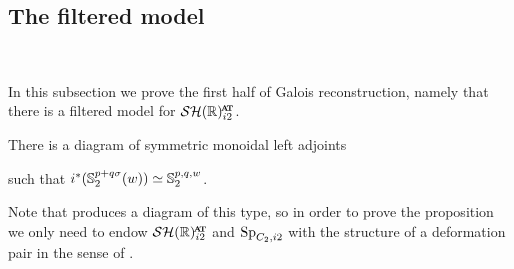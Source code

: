 


\subsection{The filtered model}\

In this subsection we prove the first half of Galois reconstruction,
namely that there is a filtered model for $\SHRat$.

\begin{prop} \label{prop:top-diagram}
  There is a diagram of symmetric monoidal left adjoints
  \begin{center}
  \end{center}
  such that $i^*(\operatorname{\mathbb{S}}_2^{p+q\sigma}(w)) \simeq \operatorname{\mathbb{S}}_2^{p,q,w}$.
\end{prop}

Note that  produces a diagram of this type,
so in order to prove the proposition we only need to endow $\SHRat$ and $\operatorname{\mathrm{Sp}}_{C_2,i2}$ with the structure of a deformation pair in the sense of .

